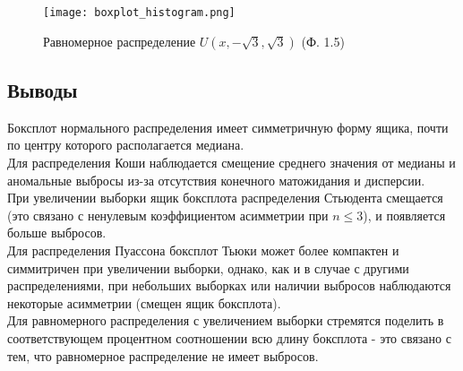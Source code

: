 \documentclass[14pt]{extarticle}
\begin{document}
\begin{figure}[H]
    \centering
    \texttt{[image: boxplot\_histogram.png]}
    \caption{Равномерное распределение \(U (x, -\sqrt{3}, \sqrt{3})\) (Ф. 1.5)}
    \label{fig:enter-label}
\end{figure}

\subsection{Выводы}

Боксплот нормального распределения имеет симметричную форму ящика, почти по центру которого располагается медиана.\\
Для распределения Коши наблюдается смещение среднего значения от медианы и аномальные выбросы из-за отсутствия конечного матожидания и дисперсии.\\
При увеличении выборки ящик боксплота распределения Стьюдента смещается (это связано с ненулевым коэффициентом асимметрии при \(n\leq 3\)), и появляется больше выбросов.\\
Для распределения Пуассона боксплот Тьюки может более компактен и симмитричен при увеличении выборки, однако, как и в случае с другими распределениями, при небольших выборках или наличии выбросов наблюдаются некоторые асимметрии (смещен ящик боксплота).\\
Для равномерного распределения с увеличением выборки стремятся поделить в соответствующем процентном соотношении всю длину боксплота - это связано с тем, что равномерное распределение не имеет выбросов.
\end{document}
